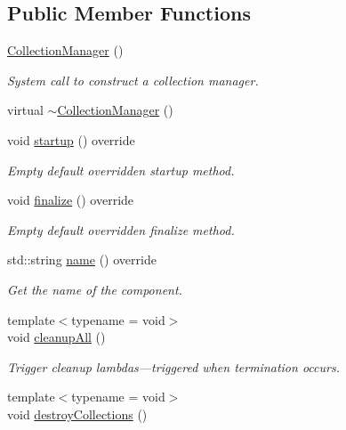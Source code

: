 \subsection*{Public Member Functions}
\begin{DoxyCompactItemize}
\item 
\hyperlink{structvt_1_1vrt_1_1collection_1_1_collection_manager_ad6c6c75f1f54ae5470847311256ae8c3}{Collection\+Manager} ()
\begin{DoxyCompactList}\small\item\em System call to construct a collection manager. \end{DoxyCompactList}\item 
virtual \hyperlink{structvt_1_1vrt_1_1collection_1_1_collection_manager_aea0c10371b37041bcc855eef0c767b85}{$\sim$\+Collection\+Manager} ()
\item 
void \hyperlink{structvt_1_1vrt_1_1collection_1_1_collection_manager_ac71095016a20dd9607f2f937bf35305e}{startup} () override
\begin{DoxyCompactList}\small\item\em Empty default overridden startup method. \end{DoxyCompactList}\item 
void \hyperlink{structvt_1_1vrt_1_1collection_1_1_collection_manager_afafcdbf36f42835471218b654252031c}{finalize} () override
\begin{DoxyCompactList}\small\item\em Empty default overridden finalize method. \end{DoxyCompactList}\item 
std\+::string \hyperlink{structvt_1_1vrt_1_1collection_1_1_collection_manager_af7cc4c83ae2792595eee99a3206ed633}{name} () override
\begin{DoxyCompactList}\small\item\em Get the name of the component. \end{DoxyCompactList}\item 
{\footnotesize template$<$typename  = void$>$ }\\void \hyperlink{structvt_1_1vrt_1_1collection_1_1_collection_manager_a7d98e5aaa63d70cbabfbcf78a6cf503f}{cleanup\+All} ()
\begin{DoxyCompactList}\small\item\em Trigger cleanup lambdas---triggered when termination occurs. \end{DoxyCompactList}\item 
{\footnotesize template$<$typename  = void$>$ }\\void \hyperlink{structvt_1_1vrt_1_1collection_1_1_collection_manager_a71865b0508bab58b6d44b44416f11983}{destroy\+Collections} ()

\end{DoxyCompactItemize}
